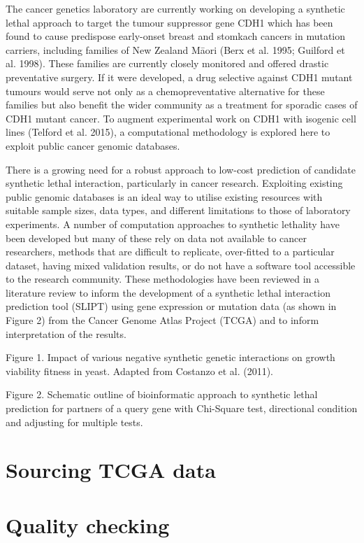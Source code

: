 The cancer genetics laboratory are currently working on developing a synthetic lethal approach to target the tumour suppressor gene CDH1 which has been found to cause predispose early-onset breast and stomkach cancers in mutation carriers, including families of New Zealand M\={a}ori (Berx et al. 1995; Guilford et al. 1998).  These families are currently closely monitored and offered drastic preventative surgery.  If it were developed, a drug selective against CDH1 mutant tumours would serve not only as a chemopreventative alternative for these families but also benefit the wider community as a treatment for sporadic cases of CDH1 mutant cancer.  To augment experimental work on CDH1 with isogenic cell lines (Telford et al. 2015), a computational methodology is explored here to exploit public cancer genomic databases.

There is a growing need for a robust approach to low-cost prediction of candidate synthetic lethal interaction, particularly in cancer research.  Exploiting existing public genomic databases is an ideal way to utilise existing resources with suitable sample sizes, data types, and different limitations to those of laboratory experiments.  A number of computation approaches to synthetic lethality have been developed but many of these rely on data not available to cancer researchers, methods that are difficult to replicate, over-fitted to a particular dataset, having mixed validation results, or do not have a software tool accessible to the research community.  These methodologies have been reviewed in a literature review to inform the development of a synthetic lethal interaction prediction tool (SLIPT) using gene expression or mutation data (as shown in Figure 2) from the Cancer Genome Atlas Project (TCGA) and to inform interpretation of the results.  

Figure 1.  Impact of various negative synthetic genetic interactions on growth viability fitness in yeast.  Adapted from Costanzo et al. (2011).   

Figure 2.  Schematic outline of bioinformatic approach to synthetic lethal prediction for partners of a query gene with Chi-Square test, directional condition and adjusting for multiple tests.

\section{Sourcing TCGA data}

\section{Quality checking}

